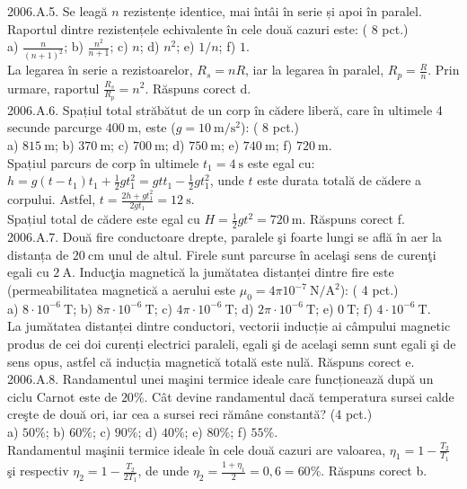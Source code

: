 2006.A.5. Se leagă $n$ rezistențe identice, mai întâi în serie și apoi în paralel. Raportul dintre rezistențele echivalente în cele două cazuri este: ( 8 pct.)\\ a) $\frac{n}{(n+1)^{2}}$; b) $\frac{n^{2}}{n+1}$; c) $n$; d) $n^{2}$; e) $1 / n$; f) $1$.\\ La legarea în serie a rezistoarelor, $R_{s}=n R$, iar la legarea în paralel, $R_{p}=\frac{R}{n}$. Prin urmare, raportul $\frac{R_{s}}{R_{p}}=n^{2}$. Răspuns corect d.\\

2006.A.6. Spațiul total străbătut de un corp în cădere liberă, care în ultimele 4 secunde parcurge $400 \mathrm{~m}$, este ($g=10 \mathrm{~m} / \mathrm{s}^{2}$): ( 8 pct.)\\ a) $815 \mathrm{~m}$; b) $370 \mathrm{~m}$; c) $700 \mathrm{~m}$; d) $750 \mathrm{~m}$; e) $740 \mathrm{~m}$; f) $720 \mathrm{~m}$.\\ Spațiul parcurs de corp în ultimele $t_{1}=4 \mathrm{~s}$ este egal cu:\\ $h=g\left(t-t_{1}\right) t_{1}+\frac{1}{2} g t_{1}^{2}=g t t_{1}-\frac{1}{2} g t_{1}^{2}$, unde $t$ este durata totală de cădere a corpului. Astfel, $t=\frac{2 h+g t_{1}^{2}}{2 g t_{1}}=12 \mathrm{~s}$.\\ Spațiul total de cădere este egal cu $H=\frac{1}{2} g t^{2}=720 \mathrm{~m}$. Răspuns corect f.\\

2006.A.7. Două fire conductoare drepte, paralele şi foarte lungi se află în aer la distanța de $20 \mathrm{~cm}$ unul de altul. Firele sunt parcurse în acelaşi sens de curenţi egali cu $2 \mathrm{~A}$. Inducţia magnetică la jumătatea distanței dintre fire este (permeabilitatea magnetică a aerului este $\mu_{0}=4 \pi 10^{-7} \mathrm{~N} / \mathrm{A}^{2}$): ( 4 pct.)\\ a) $8 \cdot 10^{-6} \mathrm{~T}$; b) $8 \pi \cdot 10^{-6} \mathrm{~T}$; c) $4 \pi \cdot 10^{-6} \mathrm{~T}$; d) $2 \pi \cdot 10^{-6} \mathrm{~T}$; e) $0 \mathrm{~T}$; f) $4 \cdot 10^{-6} \mathrm{~T}$.\\ La jumătatea distanței dintre conductori, vectorii inducție ai câmpului magnetic produs de cei doi curenți electrici paraleli, egali şi de acelaşi semn sunt egali şi de sens opus, astfel că inducția magnetică totală este nulă. Răspuns corect e.\\

2006.A.8. Randamentul unei maşini termice ideale care funcționează după un ciclu Carnot este de $20 \%$. Cât devine randamentul dacă temperatura sursei calde creşte de două ori, iar cea a sursei reci rămâne constantă? (4 pct.)\\ a) $50 \%$; b) $60 \%$; c) $90 \%$; d) $40 \%$; e) $80 \%$; f) $55 \%$.\\ Randamentul maşinii termice ideale în cele două cazuri are valoarea, $\eta_{1}=1-\frac{T_{2}}{T_{1}}$ şi respectiv $\eta_{2}=1-\frac{T_{2}}{2 T_{1}}$, de unde $\eta_{2}=\frac{1+\eta_{1}}{2}=0,6=60 \%$. Răspuns corect b.\\

